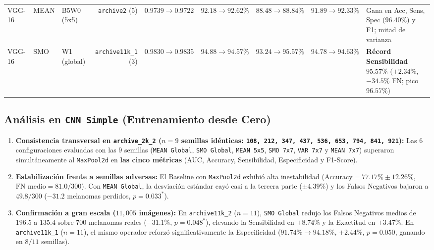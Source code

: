\documentclass[10pt,a4paper,twocolumn]{article}
\begin{document}
\begin{table}[t]
\begin{tabular}{lllrccccp{4.1cm}}
\midrule
VGG-16 & MEAN & B5W0 (5x5) & \texttt{archive2} (5) & $0.9739 \to 0.9722$ & $92.18 \to \mathbf{92.62\%}$ & $88.48 \to \mathbf{88.84\%}$ & $91.89 \to \mathbf{92.33\%}$ & Gana en Acc, Sens, Spec ($96.40\%$) y F1; mitad de varianza \\
VGG-16 & SMO & W1 (global) & \texttt{archive11k\_1} (3) & $0.9830 \to \mathbf{0.9835}$ & $94.88 \to 94.57\%$ & $93.24 \to \mathbf{95.57\%}$ & $94.78 \to 94.63\%$ & \textcolor{gain}{\textbf{Récord Sensibilidad $95.57\%$}} ($+2.34\%$, $-34.5\%$ FN; pico $96.57\%$) \\
\bottomrule
\end{tabular}
\end{table}

\subsection{Análisis en \texttt{CNN Simple} (Entrenamiento desde Cero)}
\begin{enumerate}[leftmargin=*,nosep]
  \item \textbf{Consistencia transversal en \texttt{archive\_2k\_2} ($n=9$ semillas idénticas: \texttt{108, 212, 347, 437, 536, 653, 794, 841, 921}):} Las $6$ configuraciones evaluadas con las $9$ semillas (\texttt{MEAN Global}, \texttt{SMO Global}, \texttt{MEAN 5x5}, \texttt{SMO 7x7}, \texttt{VAR 7x7} y \texttt{MEAN 7x7}) superaron simultáneamente al \texttt{MaxPool2d} en \textbf{las cinco métricas} (AUC, Accuracy, Sensibilidad, Especificidad y F1-Score).
  \item \textbf{Estabilización frente a semillas adversas:} El Baseline con \texttt{MaxPool2d} exhibió alta inestabilidad ($\text{Accuracy} = 77.17\% \pm 12.26\%$, $\text{FN medio} = 81.0/300$). Con \texttt{MEAN Global}, la desviación estándar cayó casi a la tercera parte ($\pm 4.39\%$) y los Falsos Negativos bajaron a $49.8/300$ ($-31.2$ melanomas perdidos, $p=0.033^*$).
  \item \textbf{Confirmación a gran escala ($11{,}005$ imágenes):} En \texttt{archive11k\_2} ($n=11$), \texttt{SMO Global} redujo los Falsos Negativos medios de $196.5$ a $135.4$ sobre $700$ melanomas reales ($-31.1\%$, $p=0.048^*$), elevando la Sensibilidad en $+8.74\%$ y la Exactitud en $+3.47\%$. En \texttt{archive11k\_1} ($n=11$), el mismo operador reforzó significativamente la Especificidad ($91.74\% \to 94.18\%$, $+2.44\%$, $p=0.050$, ganando en $8/11$ semillas).
\end{enumerate}
\end{document}
